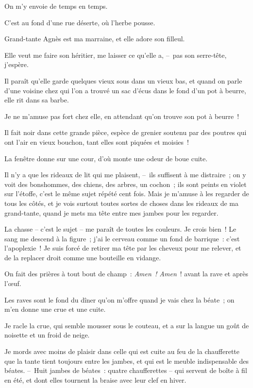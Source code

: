 \documentclass[french,twoside]{book} %
\begin{document}
On m’y envoie de temps en temps.\par
C’est au fond d’une rue déserte, où l’herbe pousse.\par
Grand-tante Agnès est ma marraine, et elle adore son filleul.\par
Elle veut me faire son héritier, me laisser ce qu’elle a, – pas son serre-tête, j’espère.\par
Il paraît qu’elle garde quelques vieux sous dans un vieux bas, et quand on parle d’une voisine chez qui l’on a trouvé un sac d’écus dans le fond d’un pot à beurre, elle rit dans sa barbe.\par
Je ne m’amuse pas fort chez elle, en attendant qu’on trouve son pot à beurre !\par
Il fait noir dans cette grande pièce, espèce de grenier soutenu par des poutres qui ont l’air en vieux bouchon, tant elles sont piquées et moisies !\par
La fenêtre donne sur une cour, d’où monte une odeur de boue cuite.\par
Il n’y a que les rideaux de lit qui me plaisent, – ils suffisent à me distraire ; on y voit des bonshommes, des chiens, des arbres, un cochon ; ils sont peints en violet sur l’étoffe, c’est le même sujet répété cent fois. Mais je m’amuse à les regarder de tous les côtés, et je vois surtout toutes sortes de choses dans les rideaux de ma grand-tante, quand je mets ma tête entre mes jambes pour les regarder.\par
La chasse – c’est le sujet – me paraît de toutes les couleurs. Je crois bien ! Le sang me descend à la figure ; j’ai le cerveau comme un fond de barrique : c’est l’apoplexie ! Je suis forcé de retirer ma tête par les cheveux pour me relever, et de la replacer droit comme une bouteille en vidange.\par
On fait des prières à tout bout de champ : \emph{Amen ! Amen} ! avant la rave et après l’œuf.\par
Les raves sont le fond du dîner qu’on m’offre quand je vais chez la béate ; on m’en donne une crue et une cuite.\par
Je racle la crue, qui semble mousser sous le couteau, et a sur la langue un goût de noisette et un froid de neige.\par
Je mords avec moins de plaisir dans celle qui est cuite au feu de la chaufferette que la tante tient toujours entre les jambes, et qui est le meuble indispensable des béates. – Huit jambes de béates : quatre chaufferettes – qui servent de boîte à fil en été, et dont elles tournent la braise avec leur clef en hiver.\par
\end{document}
